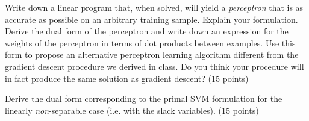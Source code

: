 \documentclass[fleqn]{homework}
\begin{document}
  \begin{problem}{3}
    \begin{question}
      Write down a linear program that, when solved, will yield a
      \textit{perceptron} that is as accurate as possible on an arbitrary
      training sample.  Explain your formulation.  Derive the dual form of the
      perceptron and write down an expression for the weights of the perceptron
      in terms of dot products between examples.  Use this form to propose an
      alternative perceptron learning algorithm different from the gradient
      descent procedure we derived in class.  Do you think your procedure will
      in fact produce the same solution as gradient descent? (15 points)
    \end{question}
  \end{problem}

  \begin{problem}{4}
    \begin{question}
      Derive the dual form corresponding to the primal SVM formulation for the
      linearly \textit{non}-separable case (i.e. with the slack variables). (15
      points)
    \end{question}
  \end{problem}
\end{document}
